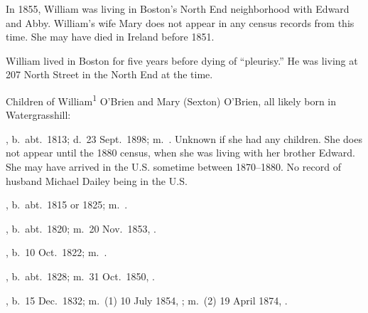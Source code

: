 In 1855, William was living in Boston's North End neighborhood with Edward and Abby.\cite{Census1855William:3} William's wife Mary does not appear in any census records from this time. She may have died in Ireland before 1851.

William lived in Boston for five years before dying of ``pleurisy.'' He was living at 207 North Street in the North End at the time.\cite{William1OBrienDeath:2}

\begin{KidsIntro}
	Children of William\textsuperscript{1} O'Brien and Mary (Sexton) O'Brien, all likely born in Watergrasshill:
\end{KidsIntro}

\begin{Kids}
	, b.\ abt.\ 1813;\cite{1880CensusAnn} d.\ 23 Sept.\ 1898;\cite{Ann2OBrienDeath:1} m.\ .\cite{Ann2OBrienDeath:2} Unknown if she had any children. She does not appear until the 1880 census, when she was living with her brother Edward. She may have arrived in the U.S. sometime between 1870--1880. No record of husband Michael Dailey being in the U.S.
	
	, b.\ abt.\ 1815 or 1825; m.\ .
	
	, b.\ abt.\ 1820; m.\ 20 Nov.\ 1853, .
	
	, b.\ 10 Oct.\ 1822; m.\ .
		
	, b.\ abt.\ 1828; m.\ 31 Oct.\ 1850, .
	
	, b.\ 15 Dec.\ 1832; m.\ (1) 10 July 1854, ; m.\ (2) 19 April 1874, .
			
\end{Kids}
